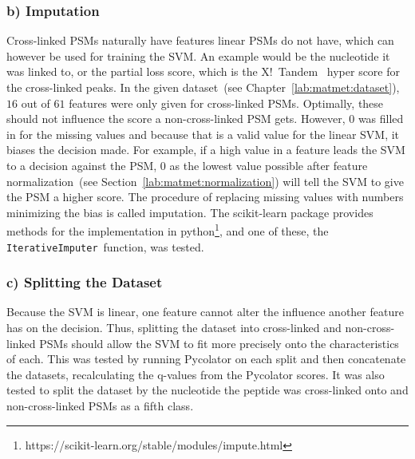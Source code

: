 \subsubsection{b) Imputation}
\label{lab:matmet:imputation}
Cross-linked PSMs naturally have features linear PSMs do not have, which can however be used for training the SVM. An example would be the nucleotide it was linked to, or the partial loss score, which is the X!~Tandem~\cite{Craig2004} hyper score for the cross-linked peaks. In the given dataset~(see Chapter~\ref{lab:matmet:dataset}), $16$ out of $61$ features were only given for cross-linked PSMs. Optimally, these should not influence the score a non-cross-linked PSM gets. However, $0$ was filled in for the missing values and because that is a valid value for the linear SVM, it biases the decision made. For example, if a high value in a feature leads the SVM to a decision against the PSM, $0$ as the lowest value possible after feature normalization~(see Section~\ref{lab:matmet:normalization}) will tell the SVM to give the PSM a higher score. The procedure of replacing missing values with numbers minimizing the bias is called imputation. The scikit-learn package provides methods for the implementation in python\footnote{https://scikit-learn.org/stable/modules/impute.html}, and one of these, the \texttt{IterativeImputer}~function, was tested.
\subsubsection{c) Splitting the Dataset}
\label{lab:matmet:splitting}
Because the SVM is linear, one feature cannot alter the influence another feature has on the decision. Thus, splitting the dataset into cross-linked and non-cross-linked PSMs should allow the SVM to fit more precisely onto the characteristics of each. This was tested by running Pycolator on each split and then concatenate the datasets, recalculating the q-values from the Pycolator scores. It was also tested to split the dataset by the nucleotide the peptide was cross-linked onto and non-cross-linked PSMs as a fifth class.
